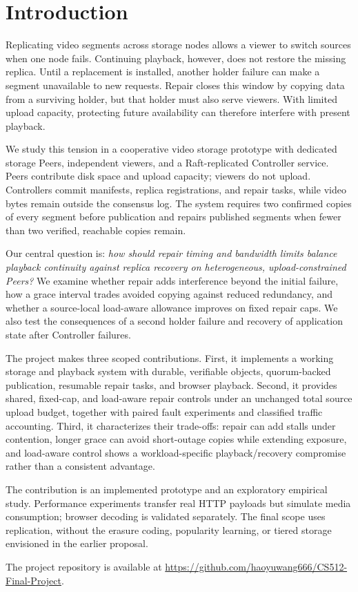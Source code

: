 \section{Introduction}
Replicating video segments across storage nodes allows a viewer to switch
sources when one node fails. Continuing playback, however, does not restore
the missing replica. Until a replacement is installed, another holder failure
can make a segment unavailable to new requests. Repair closes this window by
copying data from a surviving holder, but that holder must also serve viewers.
With limited upload capacity, protecting future availability can therefore
interfere with present playback.

We study this tension in a cooperative video storage prototype with dedicated
storage Peers, independent viewers, and a Raft-replicated Controller service.
Peers contribute disk space and upload capacity; viewers do not upload.
Controllers commit manifests, replica registrations, and repair tasks, while
video bytes remain outside the consensus log. The system requires two
confirmed copies of every segment before publication and repairs published
segments when fewer than two verified, reachable copies remain.

Our central question is: \emph{how should repair timing and bandwidth limits
balance playback continuity against replica recovery on heterogeneous,
upload-constrained Peers?} We examine whether repair adds interference beyond
the initial failure, how a grace interval trades avoided copying against
reduced redundancy, and whether a source-local load-aware allowance improves
on fixed repair caps. We also test the consequences of a second holder
failure and recovery of application state after Controller failures.

The project makes three scoped contributions. First, it implements a working
storage and playback system with durable, verifiable objects, quorum-backed
publication, resumable repair tasks, and browser playback. Second, it provides
shared, fixed-cap, and load-aware repair controls under an unchanged total
source upload budget, together with paired fault experiments and classified
traffic accounting. Third, it characterizes their trade-offs: repair can add
stalls under contention, longer grace can avoid short-outage copies while
extending exposure, and load-aware control shows a workload-specific
playback/recovery compromise rather than a consistent advantage.

The contribution is an implemented prototype and an exploratory empirical
study. Performance experiments transfer real HTTP payloads but simulate
media consumption; browser decoding is validated separately. The final scope
uses replication, without the erasure coding, popularity learning, or tiered
storage envisioned in the earlier proposal.

The project repository is available at
\url{https://github.com/haoyuwang666/CS512-Final-Project}.
